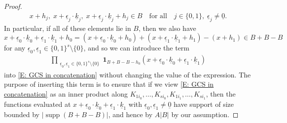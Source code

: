\documentclass[11pt]{amsart}
\theoremstyle{definition}
\newcommand{\uk}{{\underline{k}}}
\newcommand{\ueps}{{\underline{\epsilon}}}
\DeclareMathOperator{\supp}{supp}
\begin{document}
\begin{proof}
\begin{align*}
        x+h_j,\; x + \ueps_j\cdot \uk_j,\; x + \ueps_j\cdot \uk_j + h_j\in B\quad \textrm{for all}\quad j\in\{0,1\},\; \ueps_j\neq \underline{0}.
    \end{align*}
    In particular, if all of these elements lie in $B$, then we also have
    $$x+\ueps_0\cdot\uk_0 + \ueps_1\cdot \uk_1 + h_0=(x+\ueps_0\cdot\uk_0+h_0)+(x+ \ueps_1\cdot \uk_1 + h_1)-(x+h_1) \in B+B-B$$
    for any $\ueps_0, \ueps_1\in\{0,1\}^s\setminus{\{0\}}$,
    and so we can introduce the term
    \begin{align}\label{E: product of inserted indicator functions}
        \prod_{\substack{\ueps_0, \ueps_1\in\{0,1\}^s\setminus{\{0\}}}} 
        \mathbf{1}_{B+B-B-h_0}(x+\ueps_0\cdot\uk_0 + \ueps_1\cdot\uk_1)
    \end{align}
    into \eqref{E: GCS in concatenation} without changing the value of the expression. The purpose of inserting this term is to ensure that if we view \eqref{E: GCS in concatenation} as an inner product along $K_{1i_0}, \ldots, K_{si_0}, K_{1i_1}, \ldots, K_{si_1}$, then the functions evaluated at $x+\ueps_0\cdot\uk_0 + \ueps_1\cdot \uk_1$ with $\ueps_0, \ueps_1\neq \underline{0}$ have support of size bounded by $|\supp(B+B-B)|$, and hence by $A|B|$ by our assumption. 


\end{proof}
\end{document}
